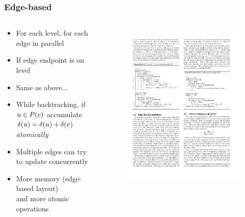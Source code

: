 \begin{frame}
  \frametitle{Edge-based}

  \begin{columns}[onlytextwidth]
    \begin{column}{0.5\textwidth}
      \begin{itemize}
        \item For each level, for each edge in parallel
        \item If edge endpoint is on level
        \item Same as above...
        \item While backtracking, if $u \in P(v)$ accumulate $\delta(u) = \delta(u) + \delta(v)$ \emph{atomically}
        \item Multiple edges can try to update \dep concurrently
        \item More memory (edge-based layout) \\ and more atomic operations
      \end{itemize}
    \end{column}

    \begin{column}{0.5\textwidth}
      \begin{figure}[t]
        \centering
        \includegraphics[width=\textwidth, height=0.8\textheight, keepaspectratio]{imgs/gpu-algo-edge}
      \end{figure}
    \end{column}
  \end{columns}

\end{frame}


